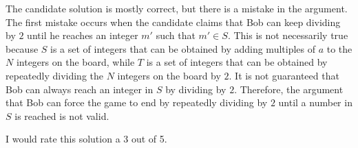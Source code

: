 The candidate solution is mostly correct, but there is a mistake in the argument. The first mistake occurs when the candidate claims that Bob can keep dividing by $2$ until he reaches an integer $m'$ such that $m' \in S$. This is not necessarily true because $S$ is a set of integers that can be obtained by adding multiples of $a$ to the $N$ integers on the board, while $T$ is a set of integers that can be obtained by repeatedly dividing the $N$ integers on the board by $2$. It is not guaranteed that Bob can always reach an integer in $S$ by dividing by $2$. Therefore, the argument that Bob can force the game to end by repeatedly dividing by $2$ until a number in $S$ is reached is not valid.

I would rate this solution a 3 out of 5.
